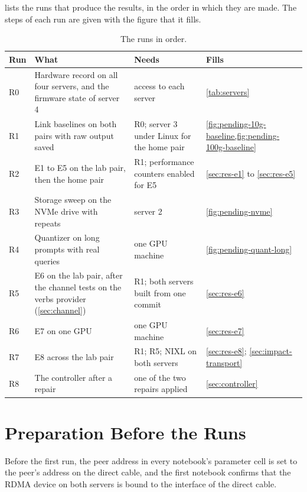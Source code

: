  lists the runs that produce the results, in the order in
which they are made. The steps of each
run are given with the figure that it fills.


\begin{tightblock}
\begin{longtable}{L{0.8cm}L{5.2cm}L{4.2cm}L{4.0cm}}
  \caption[The runs in order]{The runs in order.}\label{tab:runs}\\
  \toprule
  Run & What & Needs & Fills \\
  \midrule
  \endhead
  R0 & Hardware record on all four servers, and the firmware state of server 4 & access to each server & \cref{tab:servers} \\
  R1 & Link baselines on both pairs with raw output saved & R0; server 3 under Linux for the home pair & \cref{fig:pending-10g-baseline,fig:pending-100g-baseline} \\
  R2 & E1 to E5 on the lab pair, then the home pair & R1; performance counters enabled for E5 & \cref{sec:res-e1} to \cref{sec:res-e5} \\
  R3 & Storage sweep on the NVMe drive with repeats & server 2 & \cref{fig:pending-nvme} \\
  R4 & Quantizer on long prompts with real queries & one GPU machine & \cref{fig:pending-quant-long} \\
  R5 & E6 on the lab pair, after the channel tests on the verbs provider (\cref{sec:channel}) & R1; both servers built from one commit & \cref{sec:res-e6} \\
  R6 & E7 on one GPU & one GPU machine & \cref{sec:res-e7} \\
  R7 & E8 across the lab pair & R1; R5; NIXL on both servers & \cref{sec:res-e8}; \cref{sec:impact-transport} \\
  R8 & The controller after a repair & one of the two repairs applied & \cref{sec:controller} \\
  \bottomrule
\end{longtable}
\end{tightblock}



\section{Preparation Before the Runs}

Before the first run, the peer address in every notebook's parameter cell is set to the
peer's address on the direct cable, and the first notebook confirms that the
RDMA device on both servers is bound to the interface of the direct cable.
